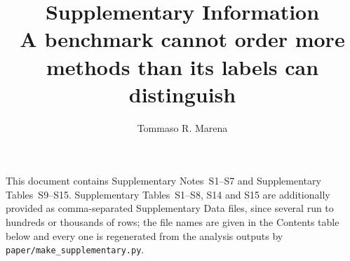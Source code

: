 \documentclass[11pt,a4paper]{article}
\title{\bfseries Supplementary Information\\[0.4em]
\large A benchmark cannot order more methods than its labels can distinguish}
\author{Tommaso R. Marena}
\date{}
\newcommand{\code}[1]{\texttt{\small #1}}
\begin{document}
\maketitle
\thispagestyle{empty}

\noindent
This document contains Supplementary Notes~S1--S7 and Supplementary
Tables~S9--S15. Supplementary Tables~S1--S8, S14 and S15 are additionally
provided as comma-separated Supplementary Data files, since several run to
hundreds or thousands of rows; the file names are given in the Contents table
below and every one is regenerated from the analysis outputs by
\code{paper/make\_supplementary.py}.

\vspace{1em}

\end{document}
